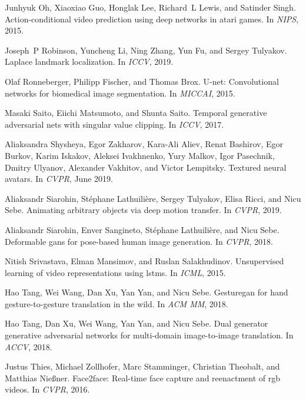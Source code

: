 \documentclass{article}
\begin{document}
\begin{thebibliography}{10}
	Junhyuk Oh, Xiaoxiao Guo, Honglak Lee, Richard~L Lewis, and Satinder Singh.
	\newblock Action-conditional video prediction using deep networks in atari
	games.
	\newblock In {\em NIPS}, 2015.
	
	Joseph~P Robinson, Yuncheng Li, Ning Zhang, Yun Fu, and Sergey Tulyakov.
	\newblock Laplace landmark localization.
	\newblock In {\em ICCV}, 2019.
	
	Olaf Ronneberger, Philipp Fischer, and Thomas Brox.
	\newblock U-net: Convolutional networks for biomedical image segmentation.
	\newblock In {\em MICCAI}, 2015.
	
	Masaki Saito, Eiichi Matsumoto, and Shunta Saito.
	\newblock Temporal generative adversarial nets with singular value clipping.
	\newblock In {\em ICCV}, 2017.
	
	Aliaksandra Shysheya, Egor Zakharov, Kara-Ali Aliev, Renat Bashirov, Egor
	Burkov, Karim Iskakov, Aleksei Ivakhnenko, Yury Malkov, Igor Pasechnik,
	Dmitry Ulyanov, Alexander Vakhitov, and Victor Lempitsky.
	\newblock Textured neural avatars.
	\newblock In {\em CVPR}, June 2019.
	
	Aliaksandr Siarohin, Stéphane Lathuilière, Sergey Tulyakov, Elisa Ricci, and
	Nicu Sebe.
	\newblock Animating arbitrary objects via deep motion transfer.
	\newblock In {\em CVPR}, 2019.
	
	Aliaksandr Siarohin, Enver Sangineto, St{\'e}phane Lathuili{\`e}re, and Nicu
	Sebe.
	\newblock Deformable gans for pose-based human image generation.
	\newblock In {\em CVPR}, 2018.
	
	Nitish Srivastava, Elman Mansimov, and Ruslan Salakhudinov.
	\newblock Unsupervised learning of video representations using lstms.
	\newblock In {\em ICML}, 2015.
	
	Hao Tang, Wei Wang, Dan Xu, Yan Yan, and Nicu Sebe.
	\newblock Gesturegan for hand gesture-to-gesture translation in the wild.
	\newblock In {\em ACM MM}, 2018.
	
	Hao Tang, Dan Xu, Wei Wang, Yan Yan, and Nicu Sebe.
	\newblock Dual generator generative adversarial networks for multi-domain
	image-to-image translation.
	\newblock In {\em ACCV}, 2018.
	
	Justus Thies, Michael Zollhofer, Marc Stamminger, Christian Theobalt, and
	Matthias Nie{\ss}ner.
	\newblock Face2face: Real-time face capture and reenactment of rgb videos.
	\newblock In {\em CVPR}, 2016.
	

\end{thebibliography}
\end{document}
